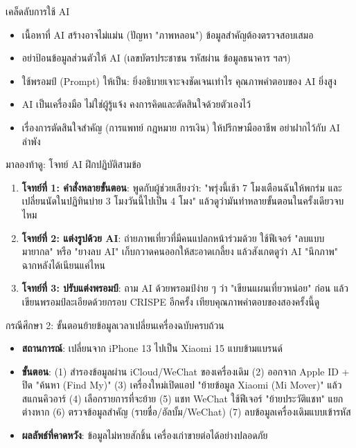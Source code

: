\begin{tcbinfo}{เคล็ดลับการใช้ AI}
\begin{itemize}
  \item เนื้อหาที่ AI สร้างอาจไม่แม่น (ปัญหา "ภาพหลอน") ข้อมูลสำคัญต้องตรวจสอบเสมอ
  \item อย่าป้อนข้อมูลส่วนตัวให้ AI (เลขบัตรประชาชน รหัสผ่าน ข้อมูลธนาคาร ฯลฯ)
  \item ใช้พรอมป์ (Prompt) ให้เป็น: ยิ่งอธิบายเจาะจงชัดเจนเท่าไร คุณภาพคำตอบของ AI ยิ่งสูง
  \item AI เป็นเครื่องมือ ไม่ใช่ผู้รู้แจ้ง คงการคิดและตัดสินใจด้วยตัวเองไว้
  \item เรื่องการตัดสินใจสำคัญ (การแพทย์ กฎหมาย การเงิน) ให้ปรึกษามืออาชีพ อย่าฝากไว้กับ AI ลำพัง
\end{itemize}

\end{tcbinfo}

\begin{tcbpractice}{มาลองท้าดู: โจทย์ AI ฝึกปฏิบัติสามข้อ}
\begin{enumerate}
  \item \textbf{โจทย์ที่ 1: คำสั่งหลายขั้นตอน}: พูดกับผู้ช่วยเสียงว่า: "พรุ่งนี้เช้า 7 โมงเตือนฉันให้พกร่ม และเปลี่ยนนัดในปฏิทินบ่าย 3 โมงวันนี้ไปเป็น 4 โมง" แล้วดูว่ามันทำหลายขั้นตอนในครั้งเดียวจบไหม
  \item \textbf{โจทย์ที่ 2: แต่งรูปด้วย AI}: ถ่ายภาพเที่ยวที่มีคนแปลกหน้าร่วมด้วย ใช้ฟีเจอร์ "ลบแบบมายากล" หรือ "ยางลบ AI" เก็บกวาดคนออกให้สะอาดเกลี้ยง แล้วสังเกตดูว่า AI "นึกภาพ" ฉากหลังได้เนียนแค่ไหน
  \item \textbf{โจทย์ที่ 3: ปรับแต่งพรอมป์}: ถาม AI ด้วยพรอมป์ง่าย ๆ ว่า "เขียนแผนเที่ยวหน่อย" ก่อน แล้วเขียนพรอมป์ละเอียดด้วยกรอบ CRISPE อีกครั้ง เทียบคุณภาพคำตอบของสองครั้งนี้ดู
\end{enumerate}

\end{tcbpractice}

\begin{tcbinfo}{กรณีศึกษา 2: ขั้นตอนย้ายข้อมูลเวลาเปลี่ยนเครื่องฉบับครบถ้วน}
\begin{itemize}
  \item \textbf{สถานการณ์}: เปลี่ยนจาก iPhone 13 ไปเป็น Xiaomi 15 แบบข้ามแบรนด์
  \item \textbf{ขั้นตอน}: (1) สำรองข้อมูลผ่าน iCloud/WeChat ของเครื่องเดิม (2) ออกจาก Apple ID + ปิด "ค้นหา (Find My)" (3) เครื่องใหม่เปิดแอป "ย้ายข้อมูล Xiaomi (Mi Mover)" แล้วสแกนคิวอาร์ (4) เลือกรายการที่จะย้าย (5) แชท WeChat ใช้ฟีเจอร์ "ย้ายประวัติแชท" แยกต่างหาก (6) ตรวจข้อมูลสำคัญ (รายชื่อ/อัลบั้ม/WeChat) (7) ลบข้อมูลเครื่องเดิมแบบเข้ารหัส
  \item \textbf{ผลลัพธ์ที่คาดหวัง}: ข้อมูลไม่หายสักชิ้น เครื่องเก่าขายต่อได้อย่างปลอดภัย
\end{itemize}

\end{tcbinfo}
